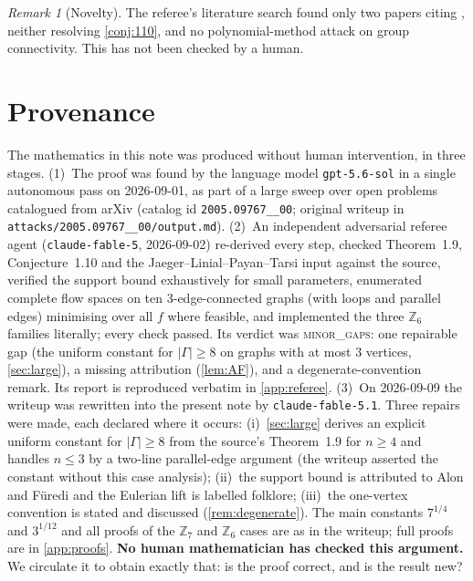 \documentclass[11pt,a4paper]{article}
\theoremstyle{plain}
\theoremstyle{definition}
\theoremstyle{remark}
\newtheorem{remark}[theorem]{Remark}
\newcommand{\Z}{{\mathbb Z}}
\begin{document}
\begin{remark}[Novelty]
The referee's literature search found only two papers citing \cite{DLMS20}, neither resolving \cref{conj:110}, and no polynomial-method attack on group connectivity. This has not been checked by a human.
\end{remark}

\section{Provenance}\label{sec:provenance}

The mathematics in this note was produced without human intervention, in three stages.
(1)~The proof was found by the language model \texttt{gpt-5.6-sol} in a single autonomous pass on 2026-09-01, as part of a large sweep over open problems catalogued from arXiv (catalog id \texttt{2005.09767\_\_00}; original writeup in \texttt{attacks/2005.09767\_\_00/output.md}).
(2)~An independent adversarial referee agent (\texttt{claude-fable-5}, 2026-09-02) re-derived every step, checked Theorem~1.9, Conjecture~1.10 and the Jaeger--Linial--Payan--Tarsi input against the source, verified the support bound exhaustively for small parameters, enumerated complete flow spaces on ten $3$-edge-connected graphs (with loops and parallel edges) minimising over all $f$ where feasible, and implemented the three $\Z_6$ families literally; every check passed. Its verdict was \textsc{minor\_gaps}: one repairable gap (the uniform constant for $|\Gamma|\ge8$ on graphs with at most $3$ vertices, \cref{sec:large}), a missing attribution (\cref{lem:AF}), and a degenerate-convention remark. Its report is reproduced verbatim in \cref{app:referee}.
(3)~On 2026-09-09 the writeup was rewritten into the present note by \texttt{claude-fable-5.1}. Three repairs were made, each declared where it occurs: (i)~\cref{sec:large} derives an explicit uniform constant for $|\Gamma|\ge8$ from the source's Theorem~1.9 for $n\ge4$ and handles $n\le3$ by a two-line parallel-edge argument (the writeup asserted the constant without this case analysis); (ii)~the support bound is attributed to Alon and Füredi and the Eulerian lift is labelled folklore; (iii)~the one-vertex convention is stated and discussed (\cref{rem:degenerate}). The main constants $7^{1/4}$ and $3^{1/12}$ and all proofs of the $\Z_7$ and $\Z_6$ cases are as in the writeup; full proofs are in \cref{app:proofs}.
\textbf{No human mathematician has checked this argument.} We circulate it to obtain exactly that: is the proof correct, and is the result new?
\end{document}
